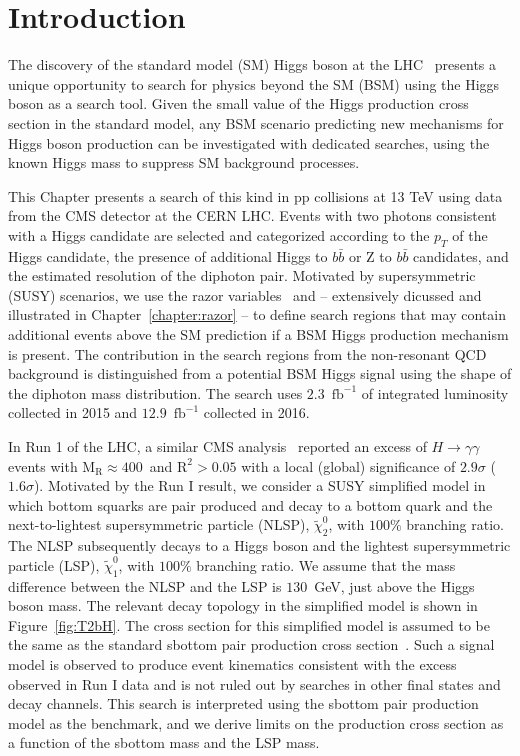 \section{Introduction}\label{sec:intro}
The discovery of the standard model (SM) Higgs boson at the LHC~\cite{ATLAShiggs,CMShiggs} 
presents a unique opportunity to search for physics beyond the SM (BSM) using the Higgs boson as a search
tool. Given the small value of the Higgs production cross section in the standard model, 
any BSM scenario predicting new mechanisms for Higgs boson production can be investigated 
with dedicated searches, using the known Higgs mass to suppress SM background processes.


This Chapter presents a search of this kind in pp collisions at 13 TeV using data from the CMS detector at the CERN LHC.
Events with two photons consistent with a Higgs candidate are selected and categorized
according to the $p_{T}$ of the Higgs candidate, the presence of additional 
Higgs to $b\bar{b}$ or Z to $b\bar{b}$ candidates, and the estimated resolution of the diphoton
pair. Motivated by supersymmetric (SUSY) scenarios, we use the razor variables~\cite{razor2010, rogan}
\MR and \Rtwo  -- extensively dicussed and illustrated in
Chapter~\ref{chapter:razor} -- to define search regions that may contain additional events above the SM prediction
if a BSM Higgs production mechanism is present.  
The contribution in the search regions from the non-resonant QCD background is distinguished from a potential BSM 
Higgs signal using the shape of the diphoton mass distribution. The search uses $2.3$~$\mathrm{fb}^{-1}$ of 
integrated luminosity collected in 2015 and $12.9$~$\mathrm{fb}^{-1}$ collected in 2016. 


In Run 1 of the LHC, a similar CMS analysis~\cite{SUS-14-017} reported an excess of $H \to \gamma \gamma$ 
events with $\mathrm{M_R}\approx 400$~\GeV and $\mathrm{R^2}>0.05$ with a local (global) significance of
$2.9\sigma$ ($1.6\sigma$). Motivated by the Run I result, we consider a
SUSY simplified model in which bottom squarks are pair produced and decay
to a bottom quark and the next-to-lightest supersymmetric particle (NLSP), 
$\tilde{\chi}^{0}_{2}$, with $100\%$ branching ratio.
The NLSP subsequently decays to a Higgs boson and the lightest 
supersymmetric particle (LSP), $\tilde{\chi}^{0}_{1}$, with $100\%$ branching ratio. 
We assume that the mass difference between the NLSP and the LSP is $130$~GeV,
just above the Higgs boson mass.
The relevant decay topology in the simplified model is shown in Figure~\ref{fig:T2bH}. 
The cross section for this simplified model is assumed to be the same
as the standard sbottom pair production cross section~\cite{Borschensky:2014cia}.
Such a signal model is observed to produce event kinematics consistent with the
excess observed in Run I data and is not ruled out by searches in
other final states and decay channels. This search is interpreted using
the sbottom pair production model as the benchmark, and we derive limits 
on the production cross section as a function of the sbottom mass and the
LSP mass.


